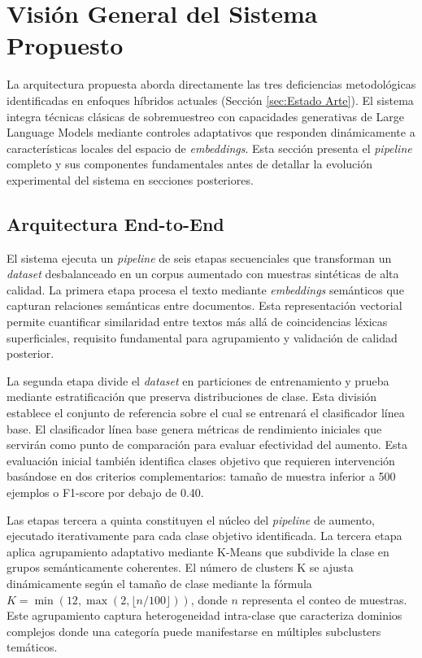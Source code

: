 \section{Visión General del Sistema Propuesto}
\label{sec:vision_general}

La arquitectura propuesta aborda directamente las tres deficiencias metodológicas identificadas en enfoques híbridos actuales (Sección \ref{sec:Estado Arte}). El sistema integra técnicas clásicas de sobremuestreo con capacidades generativas de Large Language Models mediante controles adaptativos que responden dinámicamente a características locales del espacio de \textit{embeddings}. Esta sección presenta el \textit{pipeline} completo y sus componentes fundamentales antes de detallar la evolución experimental del sistema en secciones posteriores.

\subsection{Arquitectura End-to-End}
\label{subsec:arquitectura_endtoend}

El sistema ejecuta un \textit{pipeline} de seis etapas secuenciales que transforman un \textit{dataset} desbalanceado en un corpus aumentado con muestras sintéticas de alta calidad. La primera etapa procesa el texto mediante \textit{embeddings} semánticos que capturan relaciones semánticas entre documentos. Esta representación vectorial permite cuantificar similaridad entre textos más allá de coincidencias léxicas superficiales, requisito fundamental para agrupamiento y validación de calidad posterior.

La segunda etapa divide el \textit{dataset} en particiones de entrenamiento y prueba mediante estratificación que preserva distribuciones de clase. Esta división establece el conjunto de referencia sobre el cual se entrenará el clasificador línea base. El clasificador línea base genera métricas de rendimiento iniciales que servirán como punto de comparación para evaluar efectividad del aumento. Esta evaluación inicial también identifica clases objetivo que requieren intervención basándose en dos criterios complementarios: tamaño de muestra inferior a 500 ejemplos o F1-score por debajo de 0.40.

Las etapas tercera a quinta constituyen el núcleo del \textit{pipeline} de aumento, ejecutado iterativamente para cada clase objetivo identificada. La tercera etapa aplica agrupamiento adaptativo mediante K-Means que subdivide la clase en grupos semánticamente coherentes. El número de clusters K se ajusta dinámicamente según el tamaño de clase mediante la fórmula $K = \min(12, \max(2, \lfloor n/100 \rfloor))$, donde $n$ representa el conteo de muestras. Este agrupamiento captura heterogeneidad intra-clase que caracteriza dominios complejos donde una categoría puede manifestarse en múltiples subclusters temáticos.

